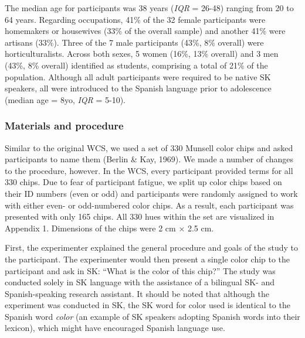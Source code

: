 \documentclass[
  english,
  ,apa7,floatsintext]{apa6}
\begin{document}
The median age for participants was 38 years (\emph{IQR} = 26-48) ranging from 20 to 64 years. Regarding occupations, 41\% of the 32 female participants were homemakers or housewives (33\% of the overall sample) and another 41\% were artisans (33\%). Three of the 7 male participants (43\%, 8\% overall) were horticulturalists. Across both sexes, 5 women (16\%, 13\% overall) and 3 men (43\%, 8\% overall) identified as students, comprising a total of 21\% of the population. Although all adult participants were required to be native SK speakers, all were introduced to the Spanish language prior to adolescence (median age = 8yo, \emph{IQR} = 5-10).

\hypertarget{materials-and-procedure}{%
\subsubsection{Materials and procedure}\label{materials-and-procedure}}

Similar to the original WCS, we used a set of 330 Munsell color chips and asked participants to name them (Berlin \& Kay, 1969). We made a number of changes to the procedure, however. In the WCS, every participant provided terms for all 330 chips. Due to fear of participant fatigue, we split up color chips based on their ID numbers (even or odd) and participants were randomly assigned to work with either even- or odd-numbered color chips. As a result, each participant was presented with only 165 chips. All 330 hues within the set are visualized in Appendix 1. Dimensions of the chips were 2 cm × 2.5 cm.

First, the experimenter explained the general procedure and goals of the study to the participant. The experimenter would then present a single color chip to the participant and ask in SK: ``What is the color of this chip?'' The study was conducted solely in SK language with the assistance of a bilingual SK- and Spanish-speaking research assistant. It should be noted that although the experiment was conducted in SK, the SK word for color used is identical to the Spanish word \emph{color} (an example of SK speakers adopting Spanish words into their lexicon), which might have encouraged Spanish language use.
\end{document}

